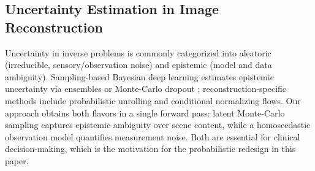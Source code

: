 \subsection{Uncertainty Estimation in Image Reconstruction}
\label{sec:rel:unc}

Uncertainty in inverse problems is commonly categorized into aleatoric
(irreducible, sensory/observation noise) and epistemic (model and data
ambiguity). Sampling-based Bayesian deep learning estimates epistemic
uncertainty via ensembles \cite{lakshminarayanan2017deep} or
Monte-Carlo dropout \cite{gal2016dropout}; reconstruction-specific
methods include probabilistic unrolling and conditional normalizing
flows. Our approach obtains both flavors in a
single forward pass: latent Monte-Carlo sampling captures epistemic
ambiguity over scene content, while a homoscedastic observation model
quantifies measurement noise. Both are essential for clinical
decision-making, which is the motivation for the probabilistic
redesign in this paper.